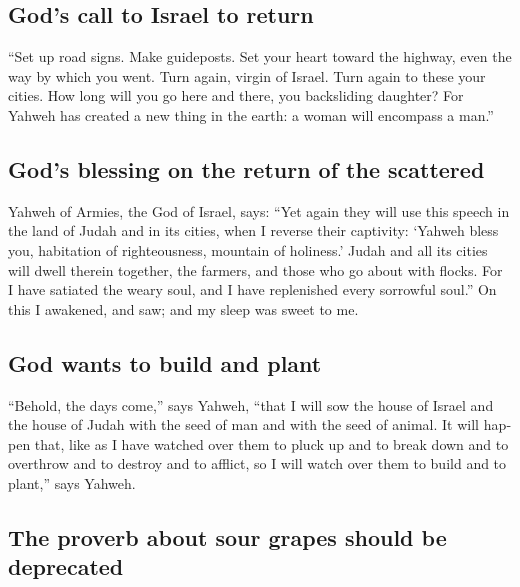 \begin{paracol}{2}
\begin{otherlanguage}{english}
\hypertarget{gods-call-to-israel-to-return}{%
\subsection{God's call to Israel to
return}\label{gods-call-to-israel-to-return}}

 ``Set up road signs. Make guideposts. Set your heart
toward the highway, even the way by which you went. Turn again, virgin
of Israel. Turn again to these your cities.  How long
will you go here and there, you backsliding daughter? For Yahweh has
created a new thing in the earth: a woman will encompass a man.''

\hypertarget{gods-blessing-on-the-return-of-the-scattered}{%
\subsection{God's blessing on the return of the
scattered}\label{gods-blessing-on-the-return-of-the-scattered}}

 Yahweh of Armies, the God of Israel, says: ``Yet again
they will use this speech in the land of Judah and in its cities, when I
reverse their captivity: `Yahweh bless you, habitation of righteousness,
mountain of holiness.'  Judah and all its cities will
dwell therein together, the farmers, and those who go about with flocks.
 For I have satiated the weary soul, and I have
replenished every sorrowful soul.''  On this I awakened,
and saw; and my sleep was sweet to me.

\hypertarget{god-wants-to-build-and-plant}{%
\subsection{God wants to build and
plant}\label{god-wants-to-build-and-plant}}

 ``Behold, the days come,'' says Yahweh, ``that I will
sow the house of Israel and the house of Judah with the seed of man and
with the seed of animal.  It will happen that, like as I
have watched over them to pluck up and to break down and to overthrow
and to destroy and to afflict, so I will watch over them to build and to
plant,'' says Yahweh.

\hypertarget{the-proverb-about-sour-grapes-should-be-deprecated}{%
\subsection{The proverb about sour grapes should be
deprecated}\label{the-proverb-about-sour-grapes-should-be-deprecated}}


\end{otherlanguage}
\end{paracol}
